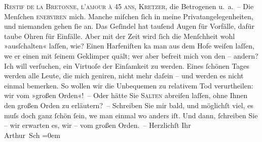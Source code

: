\begin{ledgroupsized}[t]{13cm}
                        \textsc{Restif de la Bretonne}, \textsc{l’amour à 45 ans}, \textsc{Kretzer}, die Betrogenen
                    u. a. – \pend
           \pstart
           Die Menſchen \textsc{enerviren} mich. Manche miſchen ſich in
                    meine Privatangelegenheiten, und nie{\pb}manden gehen ſie
                    an. Das Geſindel hat tauſend Augen für Vorfälle, dafür taube Ohren für Einfälle.
                    Aber mit der Zeit wird ſich die Menſchheit wohl »ausſchalten« laſſen, wie? Einen
                    Harfeniſten ka{\geminationn} man aus dem Hofe weiſen laſſen,
                        we{\geminationn} er einen mit ſeinem Geklimper quält; wer
                    aber befreit mich von den – andern? \pend
           \pstart
           Ich will verſuchen, ein Virtuoſe der Einſamkeit zu werden. Eines ſchönen Tages
                    werden alle Leute, die mich geniren, {\pb}nicht mehr daſein
                    – und werden es nicht einmal bemerken. So wollen wir die Unbequemen zu relativem
                    Tod verurtheilen: wir vom »großen Orden«! – Oder hätte Sie \textsc{Salten} abreiſen laſſen, ohne Ihnen den großen Orden zu erläutern? –\pend
           \pstart
           Schreiben Sie mir bald, und möglichſt viel, es muſs doch ganz ſchön ſein, we{\geminationn}
                    man einmal wo anders iſt. Und dann, ſchreiben Sie – wir erwarten es, wir – vom
                    großen Orden. –\pend
           \pstart
           {\pb}Herzlichſt Ihr{\\[\baselineskip]}\spacefill\mbox{Arthur Sch}\pend
           \leftskip=0em{}
         
         \endnumbering{}\end{ledgroupsized}  \newcommand{\dateiname}{L00079}\newcommand{\titel}{Arthur Schnitzler an Richard Beer-Hofmann, 11. 3. 1892}\newcommand{\editorInnen}{ Martin Anton Müller und Gerd-Hermann Susen}
      